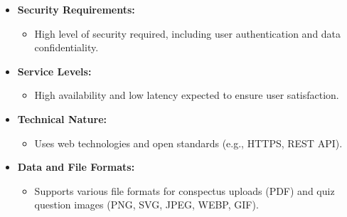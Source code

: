 \begin{itemize}
\begin{itemize}
          \end{itemize}
    \item \textbf{Security Requirements:}
          \begin{itemize}
              \item High level of security required, including user authentication and data confidentiality.
          \end{itemize}
    \item \textbf{Service Levels:}
          \begin{itemize}
              \item High availability and low latency expected to ensure user satisfaction.
          \end{itemize}
    \item \textbf{Technical Nature:}
          \begin{itemize}
              \item Uses web technologies and open standards (e.g., HTTPS, REST API).
          \end{itemize}
    \item \textbf{Data and File Formats:}
          \begin{itemize}
              \item Supports various file formats for conspectus uploads (PDF) and quiz question images (PNG, SVG, JPEG, WEBP, GIF).
          \end{itemize}
\end{itemize}

